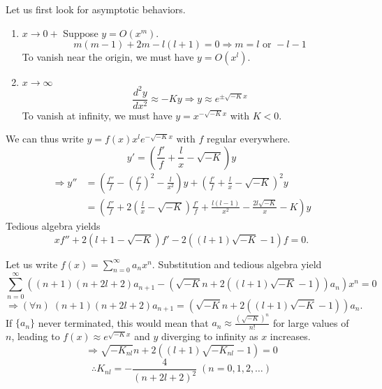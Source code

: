 \item
Let us first look for asymptotic behaviors.

\begin{enumerate}[wide, labelindent = 0pt, label = (\roman*)]
\item $x \rightarrow 0+$
Suppose $y = O(x^m)$.
\[
	m(m - 1) + 2m - l(l + 1) = 0
	\Rightarrow m = l \text{ or } -l - 1
\]
To vanish near the origin, we must have $y = O(x^l)$.

\item $x \rightarrow \infty$
\[
	\frac{d^2 y}{dx^2} \approx -Ky
	\Rightarrow y \approx e^{\pm \sqrt{-K}x}
\]
To vanish at infinity, we must have $y = x^{-\sqrt{-K}x}$ with $K < 0$.
\end{enumerate}

We can thus write $y = f(x) x^l e^{-\sqrt{-K}x}$ with $f$ regular everywhere.
\[
	y' = \left( \frac{f'}{f} + \frac{l}{x} - \sqrt{-K} \right) y
\]
\begin{align*}
	\Rightarrow y''
	&= \left( \frac{f''}{f} - {\left( \frac{f'}{f} \right)}^2 - \frac{l}{x^2} \right) y
	 + {\left( \frac{f'}{f} + \frac{l}{x} - \sqrt{-K} \right)}^2 y \\
	&= \left( \frac{f''}{f} + 2 \left( \frac{l}{x} - \sqrt{-K} \right) \frac{f'}{f} + \frac{l(l - 1)}{x^2} - \frac{2l\sqrt{-K}}{x} - K \right) y
\end{align*}
Tedious algebra yields
\[
	xf'' + 2(l + 1 - \sqrt{-K})f' - 2((l + 1)\sqrt{-K} - 1)f = 0.
\]

Let us write $f(x) = \sum_{n=0}^\infty a_n x^n$.
Substitution and tedious algebra yield
\[
	\sum_{n=0}^\infty ((n + 1)(n + 2l + 2)a_{n + 1} - (\sqrt{-K}n + 2((l + 1)\sqrt{-K} - 1)) a_n) x^n = 0
\]
\[
	\Rightarrow (\forall n)\; (n + 1)(n + 2l + 2)a_{n + 1} = (\sqrt{-K}n + 2((l + 1)\sqrt{-K} - 1)) a_n.
\]
If $\{a_n\}$ never terminated, this would mean that $a_n \approx \frac{{(\sqrt{-K})}^n}{n!}$ for large values of $n$,
leading to $f(x) \approx e^{\sqrt{-K}x}$ and $y$ diverging to infinity as $x$ increases.
\[
	\Rightarrow \sqrt{-K_{nl}}n + 2((l + 1)\sqrt{-K_{nl}} - 1) = 0
\]
\[
	\therefore K_{nl} = -\frac{4}{{(n + 2l + 2)}^2}\; (n = 0, 1, 2, \dots)
\]